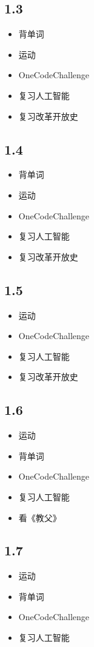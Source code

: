 \documentclass[UTF8]{ctexart}
\begin{document}
\subsection*{1.3}
\begin{itemize}
    \item 背单词
    \item 运动
    \item OneCodeChallenge
    \item 复习人工智能
    \item 复习改革开放史
\end{itemize}

\subsection*{1.4}
\begin{itemize}
    \item 背单词
    \item 运动
    \item OneCodeChallenge
    \item 复习人工智能
    \item 复习改革开放史
\end{itemize}

\subsection*{1.5}
\begin{itemize}
    \item 运动
    \item OneCodeChallenge
    \item 复习人工智能
    \item 复习改革开放史
\end{itemize}

\subsection*{1.6}
\begin{itemize}
    \item 运动
    \item 背单词
    \item OneCodeChallenge
    \item 复习人工智能
    \item 看《教父》
\end{itemize}

\subsection*{1.7}
\begin{itemize}
    \item 运动
    \item 背单词
    \item OneCodeChallenge
    \item 复习人工智能
\end{itemize}
\end{document}

